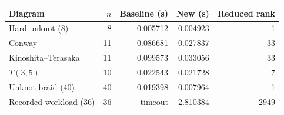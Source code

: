 \begin{center}
\small
\begin{tabular}{lrrrr}
\toprule
Diagram & $n$ & Baseline (s) & New (s) & Reduced rank \\
\midrule
Hard unknot (8) & 8 & 0.005712 & 0.004923 & 1 \\
Conway & 11 & 0.086681 & 0.027837 & 33 \\
Kinoshita--Terasaka & 11 & 0.099573 & 0.033056 & 33 \\
$T(3,5)$ & 10 & 0.022543 & 0.021728 & 7 \\
Unknot braid (40) & 40 & 0.019398 & 0.007964 & 1 \\
Recorded workload (36) & 36 & timeout & 2.810384 & 2949 \\
\bottomrule
\end{tabular}
\end{center}
